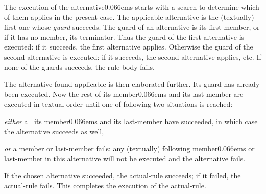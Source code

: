 \documentclass{article}
\newcommand\g[1]{{\color{blue!50!black}\sf #1}}
\renewcommand\/{\kern 0.066em}
\begin{document}
The execution of the \g{alternative}\/s starts with a search to determine which
of them applies in the present case. The applicable \g{alternative} is the
(textually) first one whose \emph{guard} succeeds. The guard
of an \g{alternative} is its first \g{member}, or if it has no \g{member},
its \g{terminator}. Thus the guard of the first \g{alternative} is executed:
if it succeeds, the first \g{alternative} applies. Otherwise the guard of
the second \g{alternative} is executed: if it succeeds, the second
\g{alternative} applies, etc. If none of the guards succeeds, the
\g{rule-body} fails.

The \g{alternative} found applicable is then elaborated further. Its guard
has already been executed. Now the rest of its \g{member}\/s and its
\g{last-member} are executed in textual order until one of following 
two situations is reached:
\begin{list}{}{\setlength\topsep{2pt}%
\setlength\partopsep{3pt}%
\setlength{}%
\setlength{}%
\setlength{}%
\setlength\leftmargin{\parindent}}
\item[\emph{either} ] all its \g{member}\/s and its \g{last-member} have succeeded, 
in which case the \g{alternative} succeeds as well,
\item[\emph{or} ] a \g{member} or \g{last-member} fails: any (textually) following
\g{member}\/s 
or \g{last-member} in this
\g{alternative} will not be executed and the \g{alternative} fails.
\end{list}
If the chosen \g{alternative} succeeded, the \g{actual-rule} succeeds; if it
failed, the \g{actual-rule} fails. This completes the execution of the
\g{actual-rule}.
\end{document}
